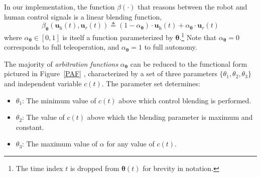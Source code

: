 \documentclass[letterpaper, 10 pt, journal, twoside]{IEEEtran}  %
\begin{document}
	In our implementation, the function $\beta(\cdot)$ that reasons between the robot and human control signals
	is a linear blending function,
	\begin{equation}
	\beta_{\boldsymbol{\theta}}(\boldsymbol{u}_{\textit{h}}(t),\boldsymbol{u}_{\textit{r}}(t)) \triangleq (1-\alpha_{\boldsymbol{\theta}}) \cdot \boldsymbol{u}_{\textit{h}}(t) +  \alpha_{\boldsymbol{\theta}} \cdot \boldsymbol{u}_{\textit{r}}(t) %
	\label{eq:blend}
	\end{equation}
	where $\alpha_{\boldsymbol{\theta}} \in [0,1]$ is itself a function parameterized by $\boldsymbol{\theta}$.\footnote{The time index $t$ is dropped from $\boldsymbol{\theta}(t)$ for brevity in notation.}
	Note that $\alpha_{\boldsymbol{\theta}}=0$ corresponds to full teleoperation,
	and $\alpha_{\boldsymbol{\theta}}=1$ to full autonomy.
	
	The majority of \textit{arbitration functions} $\alpha_{\boldsymbol{\theta}}$ can be reduced to the functional
	form pictured in Figure~\ref{PAF} \cite{dragan2012formalizing}, characterized by a set of three parameters $\{\theta_{1}, \theta_{2}, \theta_{3}\}$ and independent variable $c(t)$. The parameter set determines:
	\begin{itemize}
		\item $\theta_{1}$: The minimum value of $c(t)$ above which control blending is performed. 
		\vspace{0.1cm}
		\item $\theta_{2}$: The value of $c(t)$ above which the blending parameter is maximum and constant. 
		\vspace{0.1cm}
		\item $\theta_{3}$: The maximum value of $\alpha$ for any value of $c(t)$. 
		\vspace{0.1cm}
	\end{itemize}
	
\end{document}
